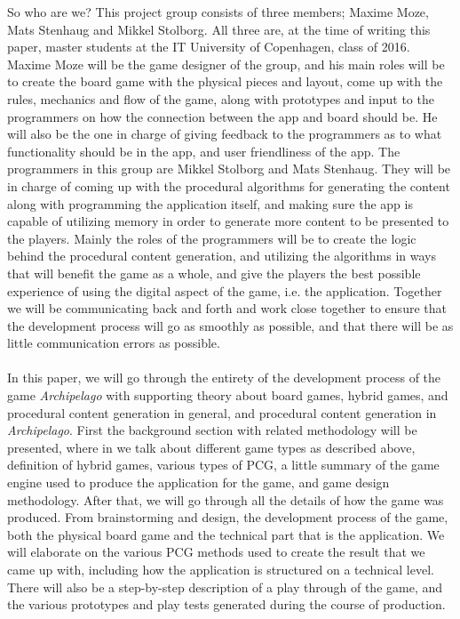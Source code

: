 So who are we? This project group consists of three members; Maxime Moze, Mats Stenhaug and Mikkel Stolborg. All three are, at the time of writing this paper, master students at the IT University of Copenhagen, class of 2016. Maxime Moze will be the game designer of the group, and his main roles will be to create the board game with the physical pieces and layout, come up with the rules, mechanics and flow of the game, along with prototypes and input to the programmers on how the connection between the app and board should be. He will also be the one in charge of giving feedback to the programmers as to what functionality should be in the app, and user friendliness of the app.
The programmers in this group are Mikkel Stolborg and Mats Stenhaug. They will be in charge of coming up with the procedural algorithms for generating the content along with programming the application itself, and making sure the app is capable of utilizing memory in order to generate more content to be presented to the players. Mainly the roles of the programmers will be to create the logic behind the procedural content generation, and utilizing the algorithms in ways that will benefit the game as a whole, and give the players the best possible experience of using the digital aspect of the game, i.e. the application.
Together we will be communicating back and forth and work close together to ensure that the development process will go as smoothly as possible, and that there will be as little communication errors as possible.\\\\
In this paper, we will go through the entirety of the development process of the game \textit{Archipelago} with supporting theory about board games, hybrid games, and procedural content generation in general, and procedural content generation in \textit{Archipelago}. First the background section with related methodology will be presented, where in we talk about different game types as described above, definition of hybrid games, various types of PCG, a little summary of the game engine used to produce the application for the game, and game design methodology.
After that, we will go through all the details of how the game was produced. From brainstorming and design, the development process of the game, both the physical board game and the technical part that is the application. We will elaborate on the various PCG methods used to create the result that we came up with, including how the application is structured on a technical level. There will also be a step-by-step description of a play through of the game, and the various prototypes and play tests generated during the course of production.
